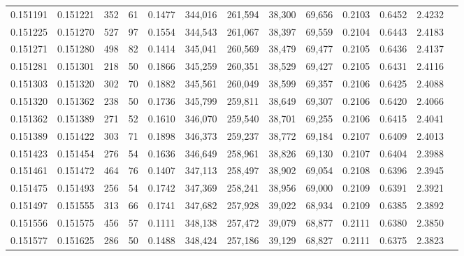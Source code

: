 \begin{tabular}{rrrrrrrrrrrrr}
0.151191 & 0.151221 &   352 &  61 &                                     0.1477 & 344,016 & 261,594 &  38,300 &  69,656 & 0.2103 & 0.6452 & 2.4232 \\
0.151225 & 0.151270 &   527 &  97 &                                     0.1554 & 344,543 & 261,067 &  38,397 &  69,559 & 0.2104 & 0.6443 & 2.4183 \\
0.151271 & 0.151280 &   498 &  82 &                                     0.1414 & 345,041 & 260,569 &  38,479 &  69,477 & 0.2105 & 0.6436 & 2.4137 \\
0.151281 & 0.151301 &   218 &  50 &                                     0.1866 & 345,259 & 260,351 &  38,529 &  69,427 & 0.2105 & 0.6431 & 2.4116 \\
0.151303 & 0.151320 &   302 &  70 &                                     0.1882 & 345,561 & 260,049 &  38,599 &  69,357 & 0.2106 & 0.6425 & 2.4088 \\
0.151320 & 0.151362 &   238 &  50 &                                     0.1736 & 345,799 & 259,811 &  38,649 &  69,307 & 0.2106 & 0.6420 & 2.4066 \\
0.151362 & 0.151389 &   271 &  52 &                                     0.1610 & 346,070 & 259,540 &  38,701 &  69,255 & 0.2106 & 0.6415 & 2.4041 \\
0.151389 & 0.151422 &   303 &  71 &                                     0.1898 & 346,373 & 259,237 &  38,772 &  69,184 & 0.2107 & 0.6409 & 2.4013 \\
0.151423 & 0.151454 &   276 &  54 &                                     0.1636 & 346,649 & 258,961 &  38,826 &  69,130 & 0.2107 & 0.6404 & 2.3988 \\
0.151461 & 0.151472 &   464 &  76 &                                     0.1407 & 347,113 & 258,497 &  38,902 &  69,054 & 0.2108 & 0.6396 & 2.3945 \\
0.151475 & 0.151493 &   256 &  54 &                                     0.1742 & 347,369 & 258,241 &  38,956 &  69,000 & 0.2109 & 0.6391 & 2.3921 \\
0.151497 & 0.151555 &   313 &  66 &                                     0.1741 & 347,682 & 257,928 &  39,022 &  68,934 & 0.2109 & 0.6385 & 2.3892 \\
0.151556 & 0.151575 &   456 &  57 &                                     0.1111 & 348,138 & 257,472 &  39,079 &  68,877 & 0.2111 & 0.6380 & 2.3850 \\
0.151577 & 0.151625 &   286 &  50 &                                     0.1488 & 348,424 & 257,186 &  39,129 &  68,827 & 0.2111 & 0.6375 & 2.3823 \\

\end{tabular}
